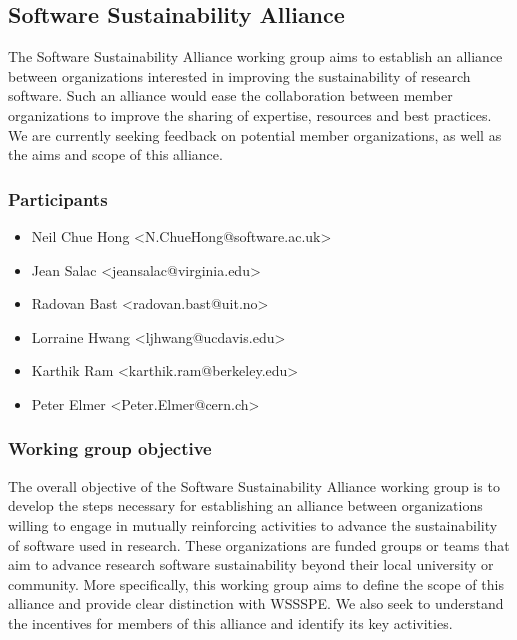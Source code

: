 \subsection{Software Sustainability Alliance}
\label{sec:alliance}


The Software Sustainability Alliance working group aims to establish an alliance between organizations interested in improving the sustainability of research software. Such an alliance would ease the collaboration between member organizations to improve the sharing of expertise, resources and best practices. We are currently seeking feedback on potential member organizations, as well as the aims and scope of this alliance.

\subsubsection{Participants}

\begin{itemize}
\item Neil Chue Hong <N.ChueHong@software.ac.uk>
\item Jean Salac <jeansalac@virginia.edu>
\item Radovan Bast <radovan.bast@uit.no>
\item Lorraine Hwang <ljhwang@ucdavis.edu>
\item Karthik Ram <karthik.ram@berkeley.edu>
\item Peter Elmer <Peter.Elmer@cern.ch>
\end{itemize}


\subsubsection{Working group objective}

The overall objective of the Software Sustainability Alliance working group is to develop the steps necessary for establishing an alliance between organizations willing to engage in mutually reinforcing activities to advance the sustainability of software used in research. These organizations are funded groups or teams that aim to advance research software sustainability beyond their local university or community. More specifically, this working group aims to define the scope of this alliance and provide clear distinction with WSSSPE. We also seek to understand the incentives for members of this alliance and identify its key activities.

